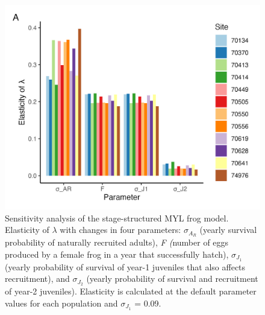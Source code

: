 \documentclass[
  letterpaper,
  DIV=11,
  numbers=noendperiod]{scrartcl}
\begin{document}
\begin{figure}

{\centering \includegraphics[width=5.72917in,height=\textheight]{figures/pop_viability_figures_for_supp.jpg}

}

\caption{\label{fig-viability-supp}Sensitivity analysis of the
stage-structured MYL frog model. Elasticity of \(\lambda\) with changes
in four parameters: \(\sigma_{A_R}\) (yearly survival probability of
naturally recruited adults), \emph{F (}number of eggs produced by a
female frog in a year that successfully hatch), \(\sigma_{J_1}\) (yearly
probability of survival of year-1 juveniles that also affects
recruitment), and \(\sigma_{J_2}\) (yearly probability of survival and
recruitment of year-2 juveniles). Elasticity is calculated at the
default parameter values for each population and \(\sigma_{J_1}\) =
0.09.}

\end{figure}

\newpage
\end{document}
